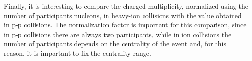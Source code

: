 Finally, it is interesting to compare the charged multiplicity, normalized using the number of participants nucleons, in heavy-ion collisions with the value obtained in p-p collisions. The normalization factor is important for this comparison, since in p-p collisions there are always two participants, while in ion collisions the number of participants depends on the centrality of the event and, for this reason, it is important to fix the centrality range.
%
\begin{figure}
  \centering
  \quad

\end{figure}
